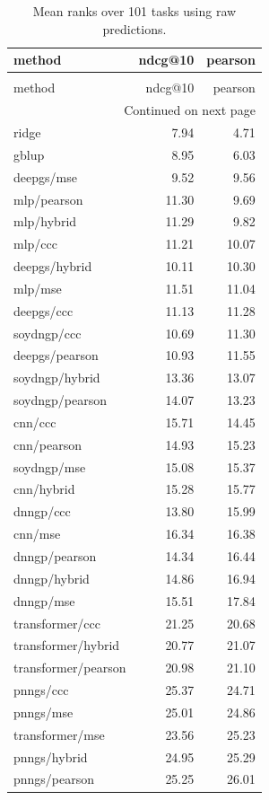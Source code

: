 \begin{longtable}{lrr}
\caption{Mean ranks over 101 tasks using raw predictions.} \label{tab:s-final-ranks} \\
\toprule
method & ndcg@10 & pearson \\
\midrule
\endfirsthead
\caption[]{Mean ranks over 101 tasks using raw predictions.} \\
\toprule
method & ndcg@10 & pearson \\
\midrule
\endhead
\midrule
\multicolumn{3}{r}{Continued on next page} \\
\midrule
\endfoot
\bottomrule
\endlastfoot
ridge & 7.94 & 4.71 \\
gblup & 8.95 & 6.03 \\
deepgs/mse & 9.52 & 9.56 \\
mlp/pearson & 11.30 & 9.69 \\
mlp/hybrid & 11.29 & 9.82 \\
mlp/ccc & 11.21 & 10.07 \\
deepgs/hybrid & 10.11 & 10.30 \\
mlp/mse & 11.51 & 11.04 \\
deepgs/ccc & 11.13 & 11.28 \\
soydngp/ccc & 10.69 & 11.30 \\
deepgs/pearson & 10.93 & 11.55 \\
soydngp/hybrid & 13.36 & 13.07 \\
soydngp/pearson & 14.07 & 13.23 \\
cnn/ccc & 15.71 & 14.45 \\
cnn/pearson & 14.93 & 15.23 \\
soydngp/mse & 15.08 & 15.37 \\
cnn/hybrid & 15.28 & 15.77 \\
dnngp/ccc & 13.80 & 15.99 \\
cnn/mse & 16.34 & 16.38 \\
dnngp/pearson & 14.34 & 16.44 \\
dnngp/hybrid & 14.86 & 16.94 \\
dnngp/mse & 15.51 & 17.84 \\
transformer/ccc & 21.25 & 20.68 \\
transformer/hybrid & 20.77 & 21.07 \\
transformer/pearson & 20.98 & 21.10 \\
pnngs/ccc & 25.37 & 24.71 \\
pnngs/mse & 25.01 & 24.86 \\
transformer/mse & 23.56 & 25.23 \\
pnngs/hybrid & 24.95 & 25.29 \\
pnngs/pearson & 25.25 & 26.01 \\
\end{longtable}
